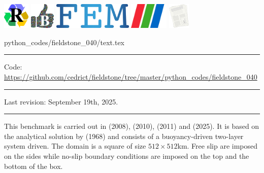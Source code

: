 \noindent
\includegraphics[height=1.25cm]{images/pictograms/replication}
\includegraphics[height=1.25cm]{images/pictograms/benchmark}
\includegraphics[height=1.25cm]{images/pictograms/FEM}
\includegraphics[height=1.25cm]{images/pictograms/paraview}
\includegraphics[height=1.25cm]{images/pictograms/publication}


\begin{flushright} {\tiny {\color{gray} python\_codes/fieldstone\_040/text.tex}} \end{flushright}

\par\noindent\rule{\textwidth}{0.4pt}

\begin{center}
\inpython
{\small Code: \url{https://github.com/cedrict/fieldstone/tree/master/python_codes/fieldstone_040}}
\end{center}

\par\noindent\rule{\textwidth}{0.4pt}

Last revision: September 19th, 2025.

\par\noindent\rule{\textwidth}{0.4pt}


This benchmark is carried out in \textcite{deka08} (2008), \textcite{gery10} (2010), 
\textcite{thie11} (2011) and \textcite{thba25} (2025). 
It is based on the analytical solution by \textcite{ramb68} (1968) and consists of 
a buoyancy-driven two-layer system driven. The domain is a square of size $512\times512$km. 
Free slip are imposed on the sides while no-slip boundary conditions are imposed on the
top and the bottom of the box.

